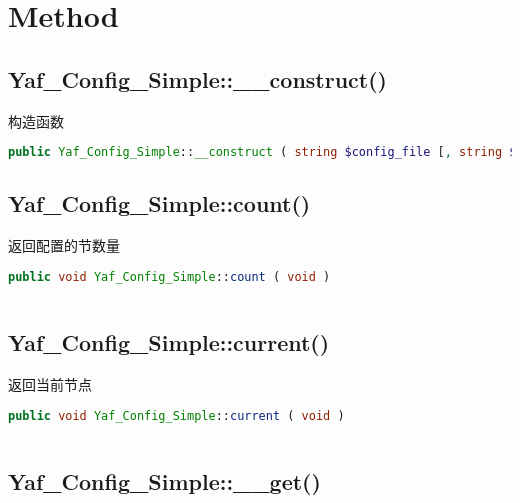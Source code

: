 \section{Method}


\subsection{Yaf\_Config\_Simple::\_\_construct()}


构造函数




\begin{lstlisting}[language=PHP]
public Yaf_Config_Simple::__construct ( string $config_file [, string $section ] )
\end{lstlisting}








\subsection{Yaf\_Config\_Simple::count()}

返回配置的节数量


\begin{lstlisting}[language=PHP]
public void Yaf_Config_Simple::count ( void )
\end{lstlisting}



\begin{lstlisting}[language=PHP]

\end{lstlisting}


\subsection{Yaf\_Config\_Simple::current()}


返回当前节点

\begin{lstlisting}[language=PHP]
public void Yaf_Config_Simple::current ( void )
\end{lstlisting}



\begin{lstlisting}[language=PHP]

\end{lstlisting}



\subsection{Yaf\_Config\_Simple::\_\_get()}


